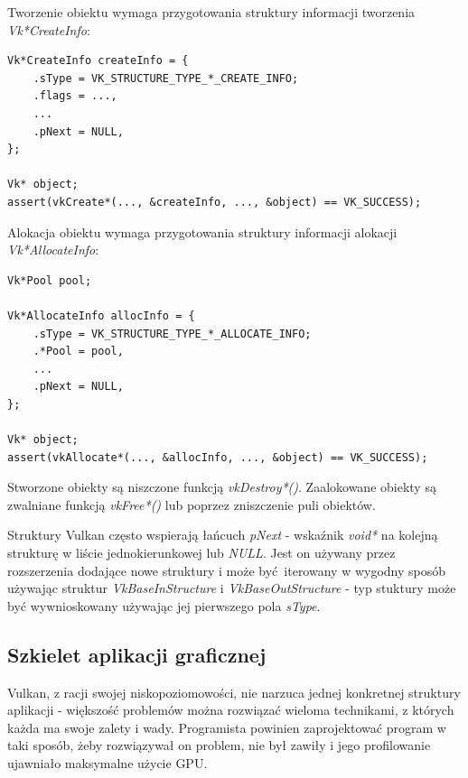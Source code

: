 Tworzenie obiektu wymaga przygotowania struktury informacji tworzenia \textit{Vk*CreateInfo}:
\lstset{language=C}
\begin{lstlisting}[caption={Tworzenie obiektu Vulkan},captionpos=b]
Vk*CreateInfo createInfo = {
	.sType = VK_STRUCTURE_TYPE_*_CREATE_INFO;
	.flags = ...,
	...
	.pNext = NULL,
};

Vk* object;
assert(vkCreate*(..., &createInfo, ..., &object) == VK_SUCCESS);
\end{lstlisting}

Alokacja obiektu wymaga przygotowania struktury informacji alokacji \textit{Vk*AllocateInfo}:
\lstset{language=C}
\begin{lstlisting}[caption={Alokacja obiektu Vulkan},captionpos=b]
Vk*Pool pool;

Vk*AllocateInfo allocInfo = {
	.sType = VK_STRUCTURE_TYPE_*_ALLOCATE_INFO;
	.*Pool = pool,
	...
	.pNext = NULL,
};

Vk* object;
assert(vkAllocate*(..., &allocInfo, ..., &object) == VK_SUCCESS);
\end{lstlisting}

Stworzone obiekty są niszczone funkcją \textit{vkDestroy*()}.
Zaalokowane obiekty są zwalniane funkcją \textit{vkFree*()} lub poprzez zniszczenie puli obiektów.

Struktury Vulkan często wspierają łańcuch \textit{pNext} - wskaźnik \textit{void*} na kolejną strukturę w liście jednokierunkowej lub \textit{NULL}. Jest on używany przez rozszerzenia dodające nowe struktury i może być iterowany w wygodny sposób używając struktur \textit{VkBaseInStructure} i \textit{VkBaseOutStructure} - typ stuktury może być wywnioskowany używając jej pierwszego pola \textit{sType}.

\subsection{Szkielet aplikacji graficznej}

Vulkan, z racji swojej niskopoziomowości, nie narzuca jednej konkretnej struktury aplikacji - większość problemów można rozwiązać wieloma technikami, z których każda ma swoje zalety i wady.
Programista powinien zaprojektować program w taki sposób, żeby rozwiązywał on problem, nie był zawiły i jego profilowanie ujawniało maksymalne użycie GPU.

